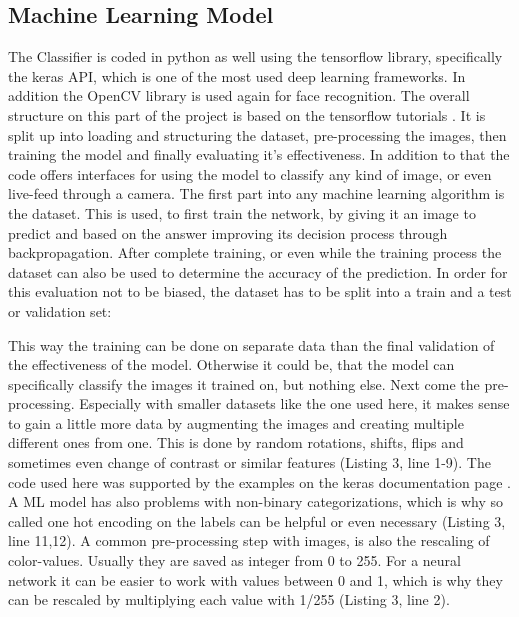 \subsection{Machine Learning Model}

The Classifier is coded in python as well using the tensorflow library,
specifically the keras API, which is one of the most used deep learning
frameworks. In addition the OpenCV library is used again for face recognition. 
\newline
The overall structure on this part of the project is based on the tensorflow
tutorials \cite{tut}. It is split up into loading and structuring the dataset,
pre-processing the images, then training the model and finally evaluating it's
effectiveness. In addition to that the code offers interfaces for using the
model to classify any kind of image, or even live-feed through a camera.
\newline
The first part into any machine learning algorithm is the dataset. This is used,
to first train the network, by giving it an image to predict and based on the
answer improving its decision process through backpropagation. After complete
training, or even while the training process the dataset can also be used to
determine the accuracy of the prediction. In order for this evaluation not to be
biased, the dataset has to be split into a train and a test or validation set:

This way the training can be done on separate data than the final validation of
the effectiveness of the model. Otherwise it could be, that the model can
specifically classify the images it trained on, but nothing else.
\newline
Next come the pre-processing. Especially with smaller datasets like the one used
here, it makes sense to gain a little more data by augmenting the images and
creating multiple different ones from one. This is done by random rotations,
shifts, flips and sometimes even change of contrast or similar features (Listing
3, line 1-9). The code used here was supported by the examples on the keras
documentation page \cite{imageDataGenerator}.
\newline
A ML model has also problems with non-binary categorizations, which is why so
called one hot encoding on the labels can be helpful or even necessary (Listing
3, line 11,12). 
\newline
A common pre-processing step with images, is also the rescaling of color-values.
Usually they are saved as integer from 0 to 255. For a neural network it can be
easier to work with values between 0 and 1, which is why they can be rescaled by
multiplying each value with 1/255 (Listing 3, line 2).

